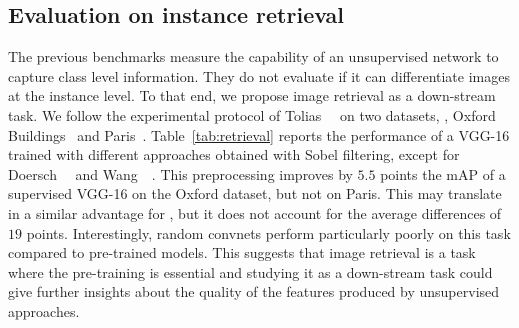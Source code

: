 \subsection{Evaluation on instance retrieval}

The previous benchmarks measure the capability of an unsupervised network to capture class level information.
They do not evaluate if it can differentiate images at the instance level.
To that end, we propose image retrieval as a down-stream task.
We follow the experimental protocol of Tolias~\etal~\cite{tolias2015particular} on two datasets, \ie, Oxford Buildings~\cite{Philbin07} and Paris~\cite{Philbin08}.
Table~\ref{tab:retrieval} reports the performance of a VGG-16 trained with different approaches obtained with Sobel filtering, except for Doersch~\etal~\cite{doersch2015unsupervised} and Wang~\etal~\cite{wang2017transitive}.
This preprocessing improves by $5.5$ points the mAP of a supervised VGG-16 on the Oxford dataset, but not on Paris.
This may translate in a similar advantage for \OURS, but it does not account for the average differences of $19$ points.
Interestingly, random convnets perform particularly poorly on this task compared to pre-trained models.
This suggests that image retrieval is a task where the pre-training is essential and studying it as a down-stream task could give further insights about the quality of the features produced by unsupervised approaches.
